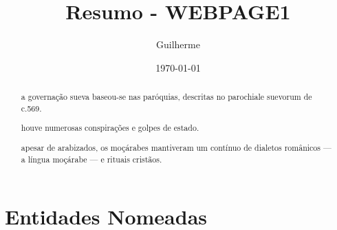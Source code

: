 \documentclass{article}
\title{Resumo - WEBPAGE1}
\author{Guilherme}
\date{\today}
\begin{document}
\maketitle

\begin{abstract}
a governação sueva baseou-se nas paróquias, descritas no parochiale suevorum de c.569.

houve numerosas conspirações e golpes de estado.

apesar de arabizados, os moçárabes mantiveram um contínuo de dialetos românicos — a língua moçárabe — e rituais cristãos.

\end{abstract}

\section{Entidades Nomeadas}
\end{document}
